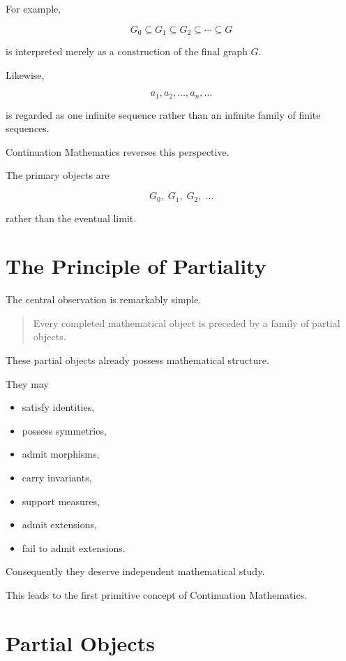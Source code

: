 \documentclass[13pt,openany]{book}
\theoremstyle{plain}
\theoremstyle{definition}
\begin{document}
For example,

\[
G_0
\subseteq
G_1
\subseteq
G_2
\subseteq
\cdots
\subseteq
G
\]

is interpreted merely as a construction of the final graph \(G\).

Likewise,

\[
a_1,a_2,\ldots,a_n,\ldots
\]

is regarded as one infinite sequence rather than an infinite family of
finite sequences.

Continuation Mathematics reverses this perspective.

The primary objects are

\[
G_0,\;
G_1,\;
G_2,\;
\dots
\]

rather than the eventual limit.

\section{The Principle of Partiality}

The central observation is remarkably simple.

\begin{quote}
Every completed mathematical object is preceded by a family of partial
objects.
\end{quote}

These partial objects already possess mathematical structure.

They may

\begin{itemize}
\item satisfy identities,
\item possess symmetries,
\item admit morphisms,
\item carry invariants,
\item support measures,
\item admit extensions,
\item fail to admit extensions.
\end{itemize}

Consequently they deserve independent mathematical study.

This leads to the first primitive concept of Continuation Mathematics.

\section{Partial Objects}
\end{document}
